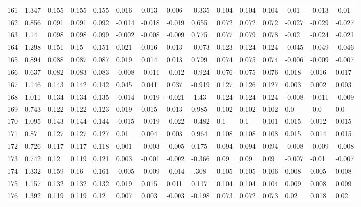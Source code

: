 \begin{table}
\begin{tabular}{|l|l|lll|lll|l|lll|lll}
		161 & 1.347 & 0.155 & 0.155 & 0.155 & 0.016 & 0.013 & 0.006 & -0.335 & 0.104 & 0.104 & 0.104 & -0.01 & -0.013 & -0.01 \\
		162 & 0.856 & 0.091 & 0.091 & 0.092 & -0.014 & -0.018 & -0.019 & 0.655 & 0.072 & 0.072 & 0.072 & -0.027 & -0.029 & -0.027 \\
		163 & 1.14 & 0.098 & 0.098 & 0.099 & -0.002 & -0.008 & -0.009 & 0.775 & 0.077 & 0.079 & 0.078 & -0.02 & -0.024 & -0.021 \\
		164 & 1.298 & 0.151 & 0.15 & 0.151 & 0.021 & 0.016 & 0.013 & -0.073 & 0.123 & 0.124 & 0.124 & -0.045 & -0.049 & -0.046 \\
		165 & 0.894 & 0.088 & 0.087 & 0.087 & 0.019 & 0.014 & 0.013 & 0.799 & 0.074 & 0.075 & 0.074 & -0.006 & -0.009 & -0.007 \\
		166 & 0.637 & 0.082 & 0.083 & 0.083 & -0.008 & -0.011 & -0.012 & -0.924 & 0.076 & 0.075 & 0.076 & 0.018 & 0.016 & 0.017 \\
		167 & 1.146 & 0.143 & 0.142 & 0.142 & 0.045 & 0.041 & 0.037 & -0.919 & 0.127 & 0.126 & 0.127 & 0.003 & 0.002 & 0.003 \\
		168 & 1.011 & 0.134 & 0.134 & 0.135 & -0.014 & -0.019 & -0.021 & -1.43 & 0.124 & 0.124 & 0.124 & -0.008 & -0.011 & -0.009 \\
		169 & 0.743 & 0.122 & 0.122 & 0.123 & 0.019 & 0.015 & 0.013 & 0.985 & 0.102 & 0.102 & 0.102 & 0.0 & -0.0 & 0.0 \\
		170 & 1.095 & 0.143 & 0.144 & 0.144 & -0.015 & -0.019 & -0.022 & -0.482 & 0.1 & 0.1 & 0.101 & 0.015 & 0.012 & 0.015 \\
		171 & 0.87 & 0.127 & 0.127 & 0.127 & 0.01 & 0.004 & 0.003 & 0.964 & 0.108 & 0.108 & 0.108 & 0.015 & 0.014 & 0.015 \\
		172 & 0.726 & 0.117 & 0.117 & 0.118 & 0.001 & -0.003 & -0.005 & 0.175 & 0.094 & 0.094 & 0.094 & -0.008 & -0.009 & -0.008 \\
		173 & 0.742 & 0.12 & 0.119 & 0.121 & 0.003 & -0.001 & -0.002 & -0.366 & 0.09 & 0.09 & 0.09 & -0.007 & -0.01 & -0.007 \\
		174 & 1.332 & 0.159 & 0.16 & 0.161 & -0.005 & -0.009 & -0.014 & -.308 & 0.105 & 0.105 & 0.106 & 0.008 & 0.005 & 0.008 \\
		175 & 1.157 & 0.132 & 0.132 & 0.132 & 0.019 & 0.015 & 0.011 & 0.117 & 0.104 & 0.104 & 0.104 & 0.009 & 0.008 & 0.009 \\
		176 & 1.392 & 0.119 & 0.119 & 0.12 & 0.007 & 0.003 & -0.003 & -0.198 & 0.073 & 0.072 & 0.073 & 0.02 & 0.018 & 0.02 \\

\end{tabular}
\end{table}
